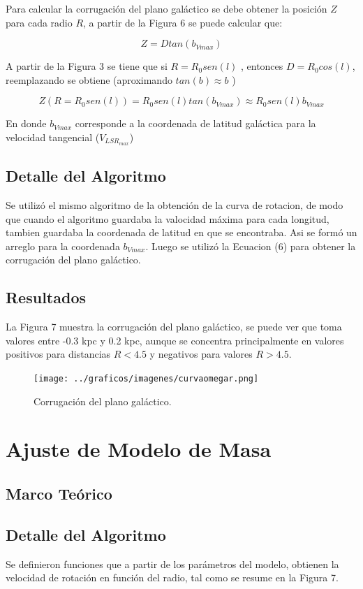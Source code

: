 \documentclass[letterpaper,oneside]{article}
\begin{document}
Para calcular la corrugación del plano galáctico se debe obtener la posición $Z$ para cada radio $R$, a partir de la Figura 6 se puede calcular que:

$$Z = D tan(b_{Vmax})$$

A partir de la Figura 3 se tiene que si $R= R_0 sen(l)$ , entonces $D = R_0 cos(l)$, reemplazando se obtiene (aproximando $tan(b) \approx b $ )

\begin{equation}
    Z(R=R_0 sen(l)) = R_0 sen(l) tan(b_{Vmax}) \approx R_0 sen(l) b_{Vmax}
\end{equation}

En donde $b_{Vmax}$ corresponde a la coordenada de latitud galáctica para la velocidad tangencial ($V_{LSR}_{max}$)

\subsection{Detalle del Algoritmo}
Se utilizó el mismo algoritmo de la obtención de la curva de rotacion, de modo que cuando el algoritmo guardaba la valocidad máxima para cada longitud, tambien guardaba la coordenada de latitud en que se encontraba. Asi se formó un arreglo para la coordenada $b_{Vmax}$. Luego se utilizó la Ecuacion (6) para obtener la corrugación del plano galáctico.

\subsection{Resultados}
La Figura 7 muestra la corrugación del plano galáctico, se puede ver que toma valores entre -0.3 kpc y 0.2 kpc, aunque se concentra principalmente en valores positivos para distancias $R<4.5$ y negativos para valores $R>4.5$.

\begin{figure}
  \centering
  \texttt{[image: ../graficos/imagenes/curvaomegar.png]}
  \caption{Corrugación del plano galáctico.}
\end{figure}

\section{Ajuste de Modelo de Masa}
\subsection{Marco Teórico}


\subsection{Detalle del Algoritmo}
Se definieron funciones que a partir de los parámetros del modelo, obtienen la velocidad de rotación en función del radio, tal como se resume en la Figura 7.
\end{document}
